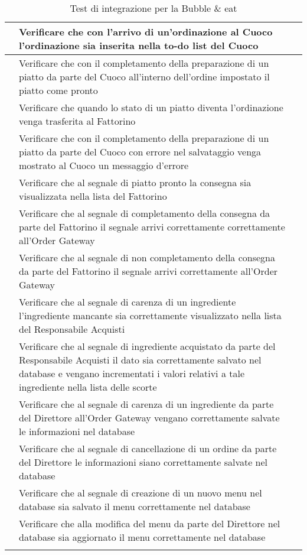 \begin{longtable}{|c|P{9cm}|c|}
	\hline {} & Verificare che con l'arrivo di un'ordinazione al Cuoco l'ordinazione sia inserita nella to-do list del Cuoco &  \\
	\hline {} & Verificare che con il completamento della preparazione di un piatto da parte del Cuoco all'interno dell'ordine impostato il piatto come pronto & \\
	\hline {} & Verificare che quando lo stato di un piatto diventa  l'ordinazione venga trasferita al Fattorino & \\
	\hline {} & Verificare che con il completamento della preparazione di un piatto da parte del Cuoco con errore nel salvataggio venga mostrato al Cuoco un messaggio d'errore &  \\
	\hline {} & Verificare che al segnale di piatto pronto la consegna sia visualizzata nella lista del Fattorino &  \\
	\hline {} & Verificare che al segnale di completamento della consegna da parte del Fattorino il segnale arrivi correttamente correttamente all'Order Gateway &  \\
	\hline {} & Verificare che al segnale di non completamento della consegna da parte del Fattorino il segnale arrivi correttamente all’Order Gateway &  \\
	\hline {} & Verificare che al segnale di carenza di un ingrediente l'ingrediente mancante sia correttamente visualizzato nella lista del Responsabile Acquisti &  \\
	\hline {} & Verificare che al segnale di ingrediente acquistato da parte del Responsabile Acquisti il dato sia correttamente salvato nel database e vengano incrementati i valori relativi a tale ingrediente nella lista delle scorte &  \\
	\hline {} & Verificare che al segnale di carenza di un ingrediente da parte del Direttore all'Order Gateway vengano correttamente salvate le informazioni nel database &  \\
	\hline {} & Verificare che al segnale di cancellazione di un ordine da parte del Direttore le informazioni siano correttamente salvate nel database &  \\
	\hline {} & Verificare che al segnale di creazione di un nuovo menu nel database sia salvato il menu correttamente nel database &  \\
	\hline {} & Verificare che alla modifica del menu da parte del Direttore nel database sia aggiornato il menu correttamente nel database &  \\
	\hline
	\caption{Test di integrazione per la Bubble \& eat}
\end{longtable}